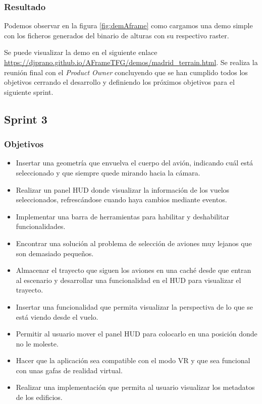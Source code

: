 \documentclass[a4paper, 11pt]{book}
\begin{document}
\subsubsection{Resultado}
Podemos observar en la figura \ref{fig:demAframe} como cargamos una demo simple con los ficheros generados del binario de alturas con su respectivo \gls{raster}. 

Se puede visualizar la demo en el siguiente enlace \url{https://djprano.github.io/AFrameTFG/demos/madrid_terrain.html}.
Se realiza la reunión final con el \emph{Product Owner} concluyendo que se han cumplido todos los objetivos cerrando el desarrollo y definiendo los próximos objetivos para el siguiente sprint.
\subsection{Sprint 3}
\subsubsection{Objetivos}
\begin{itemize}
    \item Insertar una geometría que envuelva el cuerpo del avión, indicando cuál está seleccionado y que siempre quede mirando hacia la cámara.
    \item Realizar un panel \textsc{\gls{HUD}} donde visualizar la información de los vuelos seleccionados, refrescándose cuando haya cambios mediante eventos.
    \item Implementar una barra de herramientas para habilitar y deshabilitar funcionalidades.
    \item Encontrar una solución al problema de selección de aviones muy lejanos que son demasiado pequeños.
    \item Almacenar el trayecto que siguen los aviones en una caché desde que entran al escenario y desarrollar una funcionalidad en el \textsc{\gls{HUD}} para visualizar el trayecto.
    \item Insertar una funcionalidad que permita visualizar la perspectiva de lo que se está viendo desde el vuelo.
    \item Permitir al usuario mover el panel \textsc{\gls{HUD}} para colocarlo en una posición donde no le moleste.
    \item Hacer que la aplicación sea compatible con el modo VR y que sea funcional con unas gafas de realidad virtual.
    \item Realizar una implementación que permita al usuario visualizar los metadatos de los edificios.
\end{itemize}
\end{document}
